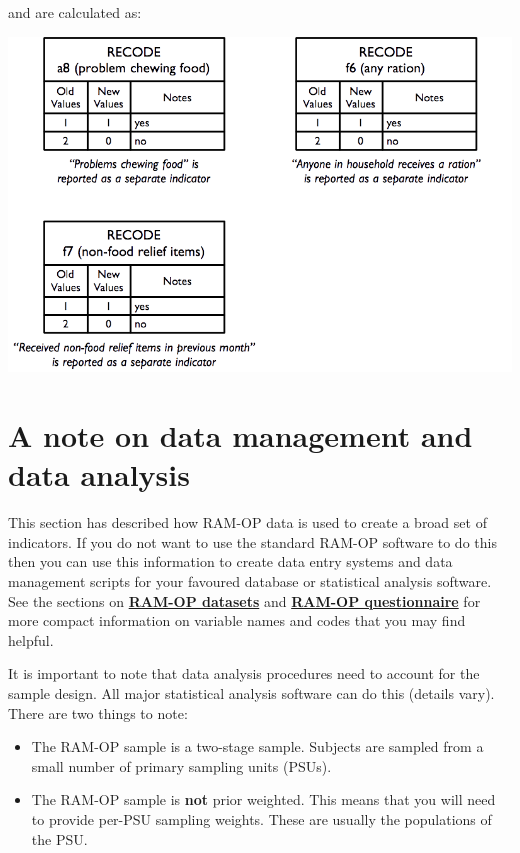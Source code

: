 \documentclass[12pt,a4paper]{book}
\providecommand{\tightlist}{%
  \setlength{\itemsep}{0pt}\setlength{\parskip}{0pt}}
\theoremstyle{definition}
\theoremstyle{definition}
\theoremstyle{definition}
\theoremstyle{remark}
\begin{document}
and are calculated as:

\begin{center}\includegraphics{figures/indicators30} \end{center}

\hypertarget{a-note-on-data-management-and-data-analysis}{%
\section{A note on data management and data
analysis}\label{a-note-on-data-management-and-data-analysis}}

This section has described how RAM-OP data is used to create a broad set
of indicators. If you do not want to use the standard RAM-OP software to
do this then you can use this information to create data entry systems
and data management scripts for your favoured database or statistical
analysis software. See the sections on
\protect\hyperlink{datasets}{\textbf{RAM-OP datasets}} and
\protect\hyperlink{questionnaire}{\textbf{RAM-OP questionnaire}} for
more compact information on variable names and codes that you may find
helpful.

It is important to note that data analysis procedures need to account
for the sample design. All major statistical analysis software can do
this (details vary). There are two things to note:

\begin{itemize}
\tightlist
\item
  The RAM-OP sample is a two-stage sample. Subjects are sampled from a
  small number of primary sampling units (PSUs).
\item
  The RAM-OP sample is \textbf{not} prior weighted. This means that you
  will need to provide per-PSU sampling weights. These are usually the
  populations of the PSU.
\end{itemize}
\end{document}
